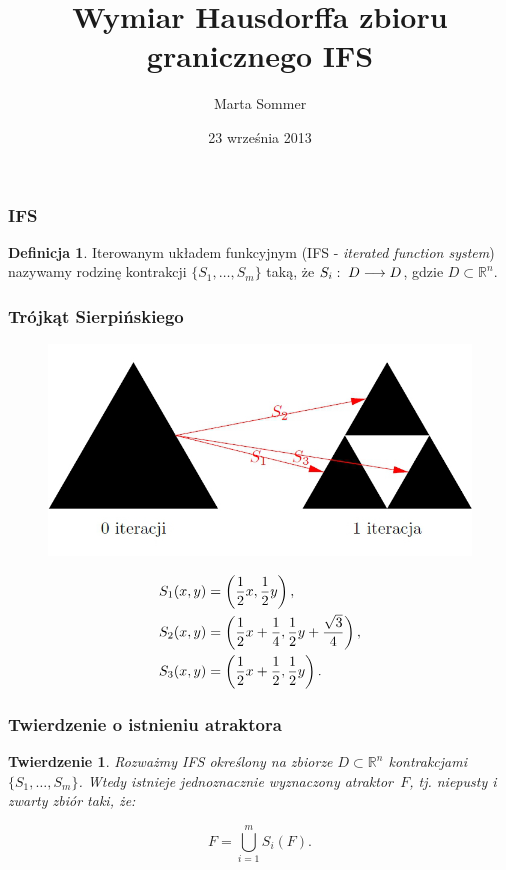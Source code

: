 \documentclass[11pt,usenames,dvipsnames,svgnames,x11names]{beamer}
\date{23 września 2013}
\author{Marta Sommer}
\title{Wymiar Hausdorffa zbioru granicznego IFS}
\theoremstyle{plain}
\newtheorem{twierdzenie}{Twierdzenie}
\theoremstyle{definition}
\newtheorem{definicja}{Definicja}
\theoremstyle{remark}
\begin{document}
\begin{frame}   %
\titlepage
\end{frame}

\begin{frame}   %
\frametitle{IFS}
	\begin{definicja}
		Iterowanym układem funkcyjnym (IFS - \textit{iterated function system}) nazywamy rodzinę kontrakcji $\lbrace S_1,\ldots,S_m\rbrace$ taką, że $S_i:\hspace{1mm} D \longrightarrow D$, gdzie $D\subset\mathbb{R}^n$.
	\end{definicja}
\end{frame}

\begin{frame}   %
\frametitle{Trójkąt Sierpińskiego}

	\begin{center}
		\begin{figure}[htbp]
			\includegraphics[scale=0.3]{bs1.jpg}
		\end{figure}
	\end{center}
$$
\aligned
S_1(x,y)&=\left(\frac{1}{2}x,\frac{1}{2}y\right),\\
S_2(x,y)&=\left(\frac{1}{2}x+\frac{1}{4},\frac{1}{2}y+\frac{\sqrt{3}}{4}\right),\\
S_3(x,y)&=\left(\frac{1}{2}x+\frac{1}{2},\frac{1}{2}y\right).
\endaligned
$$
\end{frame}

\begin{frame}   %
\frametitle{Twierdzenie o istnieniu atraktora}
\begin{twierdzenie}

Rozważmy IFS określony na zbiorze $D \subset \mathbb{R}^{n}$ kontrakcjami $ \lbrace S_1, \ldots,S_m \rbrace $. Wtedy istnieje jednoznacznie wyznaczony atraktor~$F$, tj. niepusty i zwarty zbiór taki, że:

$$
F = \bigcup^{m}_{i=1}{S_i(F)}. 
$$
\end{twierdzenie}
\end{frame}
\end{document}
